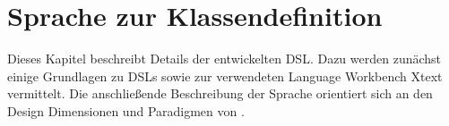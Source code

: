 \section{Sprache zur Klassendefinition}
    \label{section:solutionDetailsDSL}
    Dieses Kapitel beschreibt Details der entwickelten DSL.
    Dazu werden zunächst einige Grundlagen zu DSLs sowie
    zur verwendeten Language Workbench Xtext vermittelt.
    Die anschließende Beschreibung der Sprache orientiert sich
    an den Design Dimensionen und Paradigmen von \cite{voelter:DslEngineering}.

    
    
    
    
    
    
    
    
    
